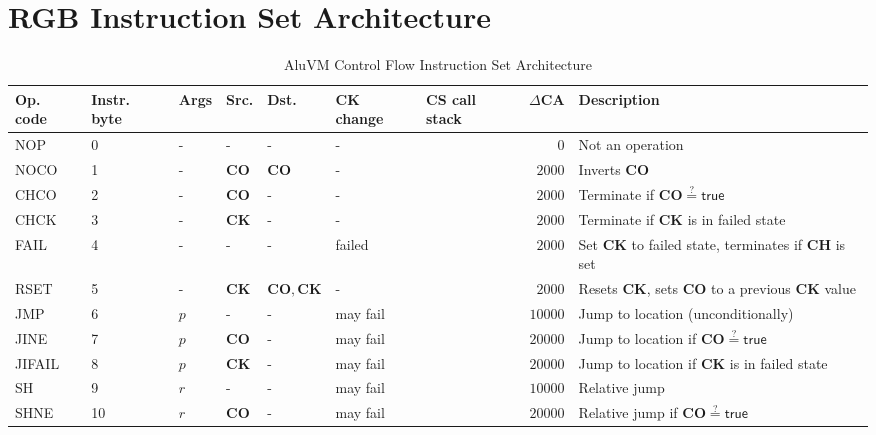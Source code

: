 \documentclass[9pt,oneside]{amsart}
\begin{document}
\newpage

\appendix
\section{RGB Instruction Set Architecture}\label{AnnexA}

\begin{table}[h]
\centering
\caption{AluVM Control Flow Instruction Set Architecture}\label{tab:aluvm}
\begin{tabular}{l p{1cm} l p{1cm} p{1cm} p{1.5cm} p{1cm} r p{5cm}}
\toprule
Op. code & Instr. byte & Args & Src. & Dst. & \textbf{CK} change & \textbf{CS} call stack & $\Delta\mathbf{CA}$ & Description \\
\midrule
NOP	    &0	&-  	&-      		&-                              &-	        &		&$0$      &Not an operation \\ \midrule
NOCO	&1	&-  	&\textbf{CO}	&$\mathbf{CO}$	                &-	      	&		&$2000$   &Inverts \textbf{CO} \\ \midrule
CHCO	&2	&-  	&\textbf{CO}	&-                              &-	      	&	    &$2000$   &Terminate if $\mathbf{CO} \stackrel{?}{=} \mathsf{true}$ \\ \midrule
CHCK	&3	&-  	&\textbf{CK}	&-                              &-	      	&	    &$2000$   &Terminate if \textbf{CK} is in failed state \\ \midrule
FAIL	&4	&-  	&-         		&-                              &\textsf{failed} &	&$2000$   &Set \textbf{CK} to failed state, terminates if \textbf{CH} is set \\ \midrule
RSET	&5	&-  	&\textbf{CK}	&$\mathbf{CO}, \mathbf{CK}$	    &-	      	&		&$2000$   &Resets \textbf{CK}, sets \textbf{CO} to a previous \textbf{CK} value \\ \midrule
JMP	    &6	&$p$\footnotemark[1] &-	&-                              &may fail	&		&$10000$  &Jump to location (unconditionally) \\ \midrule
JINE	&7	&$p$	&\textbf{CO}	&-                              &may fail	&		&$20000$  &Jump to location if $\mathbf{CO} \stackrel{?}{=} \mathsf{true}$ \\ \midrule
JIFAIL	&8	&$p$	&\textbf{CK}	&-                              &may fail	&		&$20000$  &Jump to location if \textbf{CK} is in failed state \\ \midrule
SH      &9	&$r$\footnotemark[2] &- &-                              &may fail	&		&$10000$  &Relative jump \\ \midrule
SHNE	&10	&$r$	&\textbf{CO}	&-                              &may fail	&		&$20000$  &Relative jump if $\mathbf{CO} \stackrel{?}{=} \mathsf{true}$ \\ \midrule

\end{tabular}
\end{table}
\end{document}
